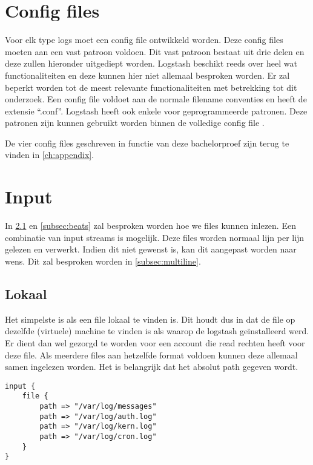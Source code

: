 \section{Config files}
\label{sec:logstash-config-files}

Voor elk type logs moet een config file ontwikkeld worden. Deze config files moeten aan een vast patroon voldoen. Dit vast patroon bestaat uit drie delen en deze zullen hieronder uitgediept worden. 
Logstash beschikt reeds over heel wat functionaliteiten en deze kunnen hier niet allemaal besproken worden. Er zal beperkt worden tot de meest relevante functionaliteiten met betrekking tot dit onderzoek. Een config file voldoet aan de normale filename conventies en heeft de extensie “.conf”.
Logstash heeft ook enkele voor geprogrammeerde patronen. Deze patronen zijn kunnen gebruikt worden binnen de volledige config file \autocite{grokpatternssite}. 

De vier config files geschreven in functie van deze bachelorproef zijn terug te vinden in \ref{ch:appendix}.

\section{Input}
\label{sec:logstash-input}

In \ref{subsec:lokaal} en \ref{subsec:beats} zal besproken worden hoe we files kunnen inlezen. Een combinatie van input streams is mogelijk. Deze files worden normaal lijn per lijn gelezen en verwerkt. Indien dit niet gewenst is, kan dit aangepast worden naar wens. Dit zal besproken worden in \ref{subsec:multiline}.

\subsection{Lokaal}
\label{subsec:lokaal}

Het simpelste is als een file lokaal te vinden is. Dit houdt dus in dat  de file op dezelfde (virtuele) machine te vinden is als waarop de logstash geïnstalleerd werd. Er dient dan wel gezorgd te worden voor een account die read rechten heeft voor deze file. Als meerdere files aan hetzelfde format voldoen kunnen deze allemaal samen ingelezen worden.
Het is belangrijk dat het absolut path gegeven wordt. 
\lstset{escapechar=@,style=customc}        
\begin{lstlisting}[frame=single]  
input {
	file {
		path => "/var/log/messages"
		path => "/var/log/auth.log"
		path => "/var/log/kern.log"
		path => "/var/log/cron.log"
	}
}
\end{lstlisting}

